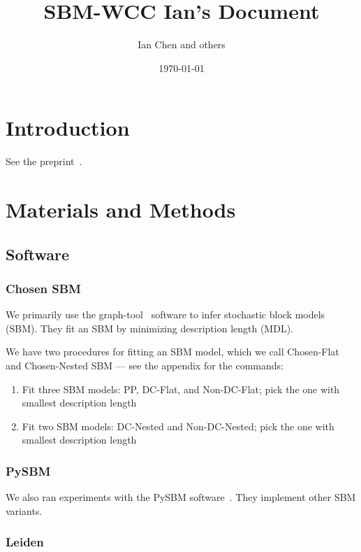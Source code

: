 \documentclass[aps,pre,superscriptaddress]{article}
\begin{document}

\title{SBM-WCC Ian's Document}
\author{Ian Chen and others}
\date{\today}
\maketitle

\section{Introduction}
See the preprint~\cite{Park25-02}.

\section{Materials and Methods}

\subsection{Software}

\subsubsection*{Chosen SBM}

We primarily use the graph-tool~\cite{graph-tool} software to infer stochastic block models (SBM).
They fit an SBM by minimizing description length (MDL).

We have two procedures for fitting an SBM model, which we call Chosen-Flat and Chosen-Nested SBM --- see the appendix for the commands:
\begin{enumerate}
    \item Fit three SBM models: PP, DC-Flat, and Non-DC-Flat; pick the one with smallest description length
    \item Fit two SBM models: DC-Nested and Non-DC-Nested; pick the one with smallest description length
\end{enumerate}

\subsubsection*{PySBM}

We also ran experiments with the PySBM software~\cite{funke19-04}.
They implement other SBM variants.

\subsubsection*{Leiden}
\end{document}
